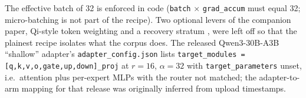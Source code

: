 The effective batch of 32 is enforced in code (\texttt{batch} $\times$ \texttt{grad\_accum} must
equal 32; micro-batching is not part of the recipe). Two optional levers of the companion paper,
Qi-style token weighting and a recovery stratum \citep{northen2026depth,qi2025safety}, were left
off so that the plainest recipe isolates what the corpus does. The released Qwen3-30B-A3B
``shallow'' adapter's \texttt{adapter\_config.json} lists
\texttt{target\_modules = [q,k,v,o,gate,up,down]\_proj} at $r{=}16$, $\alpha{=}32$ with
\texttt{target\_parameters} unset, i.e.\ attention plus per-expert MLPs with the router not
matched; the adapter-to-arm mapping for that release was originally inferred from upload timestamps.
